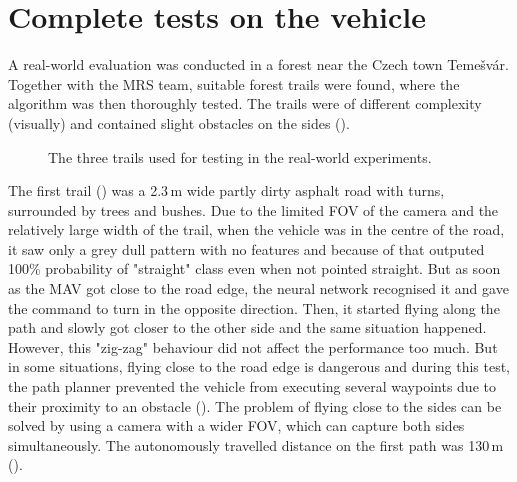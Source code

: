 \section{Complete tests on the vehicle}
\label{rwexperiment}

A real-world evaluation was conducted in a forest near the Czech town Temešvár. Together with the \acs{MRS} team, suitable forest trails were found, where the algorithm was then thoroughly tested. The trails were of different complexity (visually) and contained slight obstacles on the sides (). 

\begin{figure}[!h]

  \centering

  \centering	
  


  \centering
  \caption{The three trails used for testing in the real-world experiments.}
  \label{fig:trails}
\end{figure}

The first trail () was a 2.3\,m wide partly dirty asphalt road with turns, surrounded by trees and bushes. Due to the limited \acs{FOV} of the camera and the relatively large width of the trail, when the vehicle was in the centre of the road, it saw only a grey dull pattern with no features and because of that outputed 100\% probability of "straight" class even when not pointed straight. But as soon as the \acs{MAV} got close to the road edge, the neural network recognised it and gave the command to turn in the opposite direction. Then, it started flying along the path and slowly got closer to the other side and the same situation happened. However, this "zig-zag" behaviour did not affect the performance too much. But in some situations, flying close to the road edge is dangerous and during this test, the path planner prevented the vehicle from executing several waypoints due to their proximity to an obstacle (). The problem of flying close to the sides can be solved by using a camera with a wider \acs{FOV}, which can capture both sides simultaneously. The autonomously travelled distance on the first path was 130\,m ().

